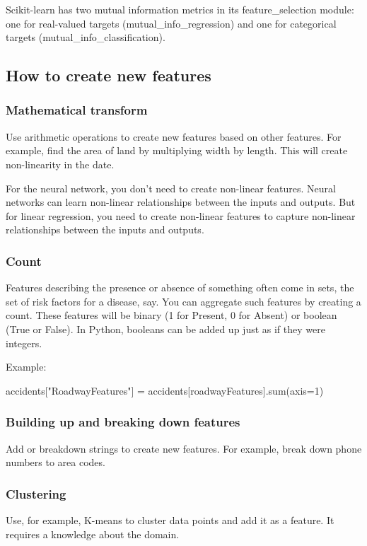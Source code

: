 \documentclass[12pt]{report}
\begin{document}
Scikit-learn has two mutual information metrics in its feature\_selection module: one for real-valued targets (mutual\_info\_regression) and one for categorical targets (mutual\_info\_classification).

\subsection{How to create new features}

\subsubsection{Mathematical transform}
Use arithmetic operations to create new features based on other features. For example, find the area of land by multiplying width by length. This will create non-linearity in the date.

For the neural network, you don't need to create non-linear features. Neural networks can learn non-linear relationships between the inputs and outputs. But for linear regression, you need to create non-linear features to capture non-linear relationships between the inputs and outputs.


\subsubsection{Count}
Features describing the presence or absence of something often come in sets, the set of risk factors for a disease, say. You can aggregate such features by creating a count. These features will be binary (1 for Present, 0 for Absent) or boolean (True or False). In Python, booleans can be added up just as if they were integers.

Example:

accidents["RoadwayFeatures"] = accidents[roadwayFeatures].sum(axis=1)

\subsubsection{Building up and breaking down features}
Add or breakdown strings to create new features. For example, break down phone numbers to area codes.

\subsubsection{Clustering}
Use, for example, K-means to cluster data points and add it as a feature. It requires a knowledge about the domain.
\end{document}
